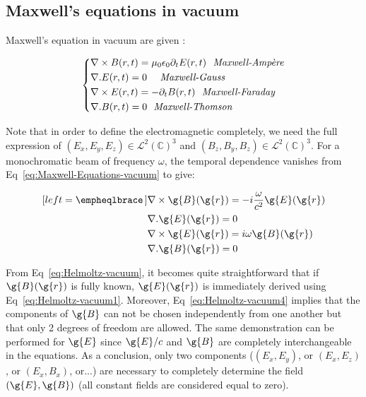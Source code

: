 \subsection{Maxwell's equations in vacuum}

\noindent Maxwell's equation in vacuum are given :

\begin{equation}
\label{eq:Maxwell-Equations-vacuum}
  \left\{
      \begin{aligned}
     & \nabla \times B(r,t) = \mu_0\epsilon_0 \partial_t E(r,t)   \ \ \rm{\textit{Maxwell-Ampère}}\\
     & \nabla . E(r,t) = 0\ \ \ \ \rm{\textit{Maxwell-Gauss}}\\
     & \nabla\times E(r,t) = - \partial_t B(r,t)\ \ \rm{\textit{Maxwell-Faraday}}\\ 
    & \nabla . B(r,t) = 0\ \ \rm{\textit{Maxwell-Thomson}}\\
      \end{aligned}
    \right.
\end{equation}

\noindent Note that in order to define the electromagnetic completely, we need the full expression of $(E_x,E_y,E_z) \in \mathcal{L}^2(\mathbb{C})^3$ and $(B_z,B_y,B_z)\in \mathcal{L}^2(\mathbb{C})^3$. For a monochromatic beam of frequency $\omega$, the temporal dependence vanishes from Eq~\ref{eq:Maxwell-Equations-vacuum} to give:

\begin{minipage}{0.75\textwidth}
\begin{center}
\begin{subequations}
\label{eq:Helmoltz-vacuum}
\begin{align}[left = \empheqlbrace\,]
     & \nabla \times \g{B}(\g{r}) = -i\frac{\omega}{c^2} \g{E}(\g{r}) \label{eq:Helmoltz-vacuum1}\\
     & \nabla . \g{E}(\g{r}) = 0 \label{eq:Helmoltz-vacuum2}\\
     & \nabla\times \g{E}(\g{r}) = i\omega \g{B}(\g{r}) \label{eq:Helmoltz-vacuum3}\\ 
    & \nabla . \g{B}(\g{r}) = 0 \label{eq:Helmoltz-vacuum4}
\end{align}
\end{subequations}
\end{center}
\end{minipage}


\noindent From Eq~\ref{eq:Helmoltz-vacuum}, it becomes quite straightforward that if $\g{B}(\g{r})$ is fully known, $\g{E}(\g{r})$ is immediately derived using Eq~\ref{eq:Helmoltz-vacuum1}. Moreover, Eq~\ref{eq:Helmoltz-vacuum4} implies that the components of $\g{B}$ can not be chosen independently from one another but that only 2 degrees of freedom are allowed. 
The same demonstration can be performed for $\g{E}$ since $\g{E}/c$ and $\g{B}$ are completely interchangeable in the equations. 
As a conclusion, only two components ($(E_x,E_y)$, or $(E_x,E_z)$, or $(E_x,B_x)$, or...) are necessary to completely determine the field $(\g{E},\g{B})$ (all constant fields are considered equal to zero).

